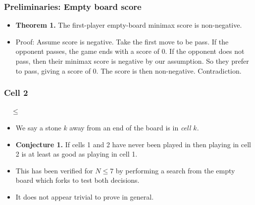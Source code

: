 \documentclass{beamer}
\begin{document}
    \begin{frame}
        \frametitle{Preliminaries: Empty board score}
        \begin{itemize}
            \item \textbf{Theorem 1.} The first-player empty-board minimax score is non-negative.
            \item Proof: Assume score is negative. Take the first move to be
                pass. If the opponent passes, the game ends with a score of
                0. If the opponent does not pass, then their minimax score is
                negative by our assumption. So they prefer to pass, giving a
                score of 0. The score is then non-negative. Contradiction.
        \end{itemize}
    \end{frame}

    \begin{frame}
        \frametitle{Cell 2}
        \begin{center}
            \cleargoban
            \showgoban[b2,k2]\ \ $\leq$
            \cleargoban
            \showgoban[b2,k2]
        \end{center}
        \begin{itemize}
            \item We say a stone $k$ away from an end of the board is in \textit{cell $k$}.
            \item \textbf{Conjecture 1.} If cells 1 and 2 have never been played
                in then playing in cell 2 is at least as good as playing in cell 1.
            \pause
            \item This has been verified for $N \leq 7$ by performing a search from the empty board which forks
                to test both decisions.
            \item It does not appear trivial to prove in general.
        \end{itemize}
    \end{frame}
\end{document}
